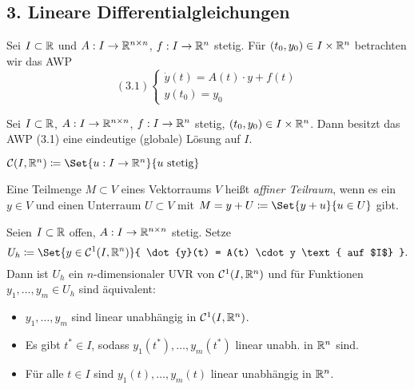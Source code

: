 \documentclass{cheat-sheet}
\begin{document}
\begin{samepage}
\section{3. Lineare Differentialgleichungen}

\begin{prob}
  Sei $I \subset \mathbb{R}$ und $A : I \to \mathbb{R}^{n \times n}$, $f : I \to \mathbb{R}^n$ stetig. Für $(t_0, y_0) \in I \times \mathbb{R}^n$ betrachten wir das AWP
  \[
    (3.1) \left\{ \begin{array}{l}
    \dot{y}(t) = A(t) \cdot y + f(t)\\
    y(t_0) = y_0
    \end{array} \right.
  \]
\end{prob}

\begin{satz}
  Sei $I \subset \mathbb{R}$, $A : I \to \mathbb{R}^{n \times n}$, $f : I \to \mathbb{R}^n$ stetig, $(t_0, y_0) \in I \times \mathbb{R}^n$. Dann besitzt das AWP (3.1) eine eindeutige (globale) Lösung auf $I$.
\end{satz}

\begin{nota}
  $\mathcal{C}(I, \R^n) \coloneqq \Set{ u : I \to \R^n }{ u \text{ stetig} }$
\end{nota}
\end{samepage}


\begin{defn}
  Eine Teilmenge $M \subset V$ eines Vektorraums $V$ heißt \emph{affiner Teilraum}, wenn es ein $y \in V$ und einen Unterraum $U \subset V$ mit $M = y + U \coloneqq \Set{ y + u }{ u \in U }$ gibt.
\end{defn}

\begin{satz}
  Seien $I \subset \mathbb{R}$ offen, $A : I \to \mathbb{R}^{n \times n}$ stetig. Setze
  \[ U_h \coloneqq \Set{ y \in \mathcal{C}^1(I, \R^n) }{ \dot{y}(t) = A(t) \cdot y \text{ auf $I$} }. \]
  Dann ist $U_h$ ein $n$-dimensionaler UVR von $\mathcal{C}^1(I, \mathbb{R}^n)$ und für Funktionen $y_1, \ldots, y_m \in U_h$ sind äquivalent:
  \begin{itemize}
    \item $y_1, \ldots, y_m$ sind linear unabhängig in $\mathcal{C}^1(I, \mathbb{R}^n)$.
    \item Es gibt $t^* \in I$, sodass $y_1(t^*), \ldots, y_m(t^*)$ linear unabh. in $\mathbb{R}^n$ sind.
    \item Für alle $t \in I$ sind $y_1(t), \ldots, y_m(t)$ linear unabhängig in $\mathbb{R}^n$.
  \end{itemize}
\end{satz}
\end{document}

